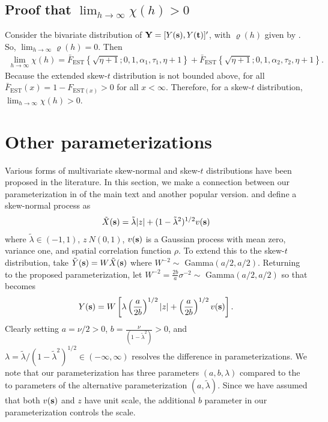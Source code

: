 \subsection*{Proof that $\lim_{h \rightarrow \infty} \chi(h) > 0$}
Consider the bivariate distribution of $\mathbf{Y} = [Y(\mathbf{s}), Y(\mathbf{t})]^\prime$, with $\varrho(h)$ given by .
So, $\lim_{h \rightarrow \infty} \varrho(h) = 0$.
Then
\begin{align}
  \lim_{h \rightarrow \infty} \chi(h) = \bar{F}_{\text{EST}}\left\{ \sqrt{\eta + 1}; 0, 1, \alpha_1, \tau_1, \eta + 1 \right\} + \bar{F}_{\text{EST}}\left\{ \sqrt{\eta + 1}; 0, 1, \alpha_2, \tau_2, \eta + 1 \right\}.
\end{align}
Because the extended skew-$t$ distribution is not bounded above, for all $\bar{F}_{\text{EST}}(x) = 1 - F_{\text{EST} (x)} > 0$ for all $x < \infty$.
Therefore, for a skew-$t$ distribution, $\lim_{h \rightarrow \infty} \chi(h) > 0$.

\section{Other parameterizations} \label{sta:otherparams}
Various forms of multivariate skew-normal and skew-$t$ distributions have been proposed in the literature.
In this section, we make a connection between our parameterization in  of the main text and another popular version.
\citet{Azzalini2014} and \citet{Beranger2016} define a skew-normal process as
\begin{align}
  \tilde{X}(\mathbf{s}) = \tilde{\lambda}|z| + (1 - \tilde{\lambda}^2)^{1 / 2} v(\mathbf{s})
\end{align}
where $\tilde{\lambda} \in (-1, 1)$, $z ~ N(0, 1)$, $v(\mathbf{s})$ is a Gaussian process with mean zero, variance one, and spatial correlation function $\rho$.
To extend this to the skew-$t$ distribution, \citet{Azzalini2003} take $\tilde{Y}(\mathbf{s}) = W\tilde{X}(\mathbf{s})$ where $W^{-2} \sim $ Gamma$(a / 2, a / 2)$.
Returning to the proposed parameterization, let $W^{-2} = \frac{2b}{a}\sigma^{-2} \sim$ Gamma$(a / 2, a / 2)$ so that  becomes
\begin{align}
  Y(\mathbf{s}) = W \left[ \lambda \left(\frac{a}{2b}\right)^{1 / 2} |z| + \left(\frac{a}{2b}\right)^{1 / 2} v(\mathbf{s}) \right].
\end{align}
Clearly setting $a = \nu / 2 > 0$, $b = \frac{\nu}{(1 - \tilde{\lambda}^2)} > 0$, and $\lambda = \tilde{\lambda} / (1 - \tilde{\lambda}^2)^{1 / 2} \in (-\infty, \infty)$ resolves the difference in parameterizations.
We note that our parameterization has three parameters $(a, b, \lambda)$ compared to the to parameters of the alternative parameterization $(a, \tilde{\lambda})$.
Since we have assumed that both $v(\mathbf{s})$ and $z$ have unit scale, the additional $b$ parameter in our parameterization controls the scale.

